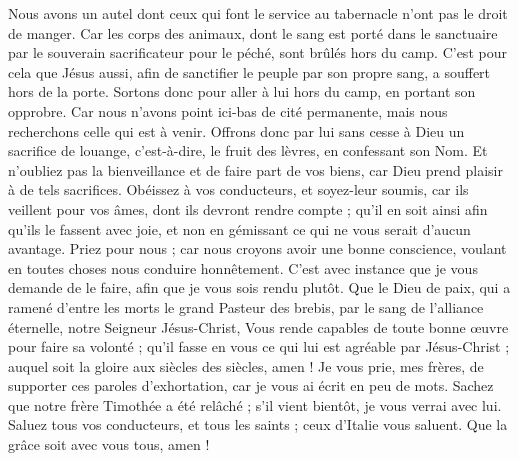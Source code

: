 \begin{multicols}{2}
Nous avons un autel dont ceux qui font le service au tabernacle n'ont pas le droit de manger.
Car les corps des animaux, dont le sang est porté dans le sanctuaire par le souverain sacrificateur pour le péché, sont brûlés hors du camp.
C'est pour cela que Jésus aussi, afin de sanctifier le peuple par son propre sang, a souffert hors de la porte.
Sortons donc pour aller à lui hors du camp, en portant son opprobre.
Car nous n'avons point ici-bas de cité permanente, mais nous recherchons celle qui est à venir.
Offrons donc par lui sans cesse à Dieu un sacrifice de louange, c'est-à-dire, le fruit des lèvres, en confessant son Nom.
Et n'oubliez pas la bienveillance et de faire part de vos biens, car Dieu prend plaisir à de tels sacrifices.
Obéissez à vos conducteurs, et soyez-leur soumis, car ils veillent pour vos âmes, dont ils devront rendre compte ; qu’il en soit ainsi afin qu’ils le fassent avec joie, et non en gémissant ce qui ne vous serait d’aucun avantage.
Priez pour nous ; car nous croyons avoir une bonne conscience, voulant en toutes choses nous conduire honnêtement.
C’est avec instance que je vous demande de le faire, afin que je vous sois rendu plutôt.
Que le Dieu de paix, qui a ramené d'entre les morts le grand Pasteur des brebis, par le sang de l'alliance éternelle, notre Seigneur Jésus-Christ,
Vous rende capables de toute bonne œuvre pour faire sa volonté ; qu’il fasse en vous ce qui lui est agréable par Jésus-Christ ; auquel soit la gloire aux siècles des siècles, amen !
Je vous prie, mes frères, de supporter ces paroles d'exhortation, car je vous ai écrit en peu de mots.
Sachez que notre frère Timothée a été relâché ; s'il vient bientôt, je vous verrai avec lui.
Saluez tous vos conducteurs, et tous les saints ; ceux d'Italie vous saluent.
Que la grâce soit avec vous tous, amen !
\PPE{}
\end{multicols}
